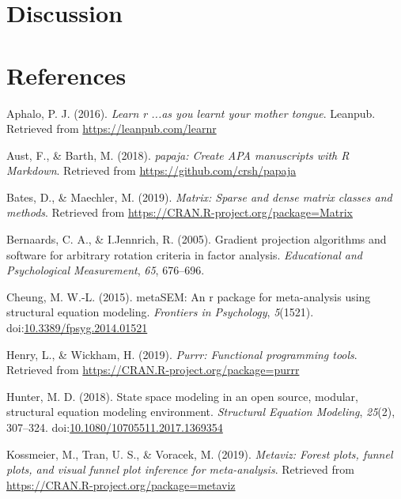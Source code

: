 \documentclass[man]{apa6}
\begin{document}
\hypertarget{discussion}{%
\section{Discussion}\label{discussion}}

\newpage

\hypertarget{references}{%
\section{References}\label{references}}

\begingroup
\setlength{\parindent}{-0.5in}
\setlength{\leftskip}{0.5in}

\hypertarget{refs}{}
\leavevmode\hypertarget{ref-R-gginnards}{}%
Aphalo, P. J. (2016). \emph{Learn r ...as you learnt your mother tongue}. Leanpub. Retrieved from \url{https://leanpub.com/learnr}

\leavevmode\hypertarget{ref-R-papaja}{}%
Aust, F., \& Barth, M. (2018). \emph{papaja: Create APA manuscripts with R Markdown}. Retrieved from \url{https://github.com/crsh/papaja}

\leavevmode\hypertarget{ref-R-Matrix}{}%
Bates, D., \& Maechler, M. (2019). \emph{Matrix: Sparse and dense matrix classes and methods}. Retrieved from \url{https://CRAN.R-project.org/package=Matrix}

\leavevmode\hypertarget{ref-R-GPArotation}{}%
Bernaards, C. A., \& I.Jennrich, R. (2005). Gradient projection algorithms and software for arbitrary rotation criteria in factor analysis. \emph{Educational and Psychological Measurement}, \emph{65}, 676--696.

\leavevmode\hypertarget{ref-R-metaSEM}{}%
Cheung, M. W.-L. (2015). metaSEM: An r package for meta-analysis using structural equation modeling. \emph{Frontiers in Psychology}, \emph{5}(1521). doi:\href{https://doi.org/10.3389/fpsyg.2014.01521}{10.3389/fpsyg.2014.01521}

\leavevmode\hypertarget{ref-R-purrr}{}%
Henry, L., \& Wickham, H. (2019). \emph{Purrr: Functional programming tools}. Retrieved from \url{https://CRAN.R-project.org/package=purrr}

\leavevmode\hypertarget{ref-R-OpenMx_c}{}%
Hunter, M. D. (2018). State space modeling in an open source, modular, structural equation modeling environment. \emph{Structural Equation Modeling}, \emph{25}(2), 307--324. doi:\href{https://doi.org/10.1080/10705511.2017.1369354}{10.1080/10705511.2017.1369354}

\leavevmode\hypertarget{ref-R-metaviz}{}%
Kossmeier, M., Tran, U. S., \& Voracek, M. (2019). \emph{Metaviz: Forest plots, funnel plots, and visual funnel plot inference for meta-analysis}. Retrieved from \url{https://CRAN.R-project.org/package=metaviz}
\end{document}
